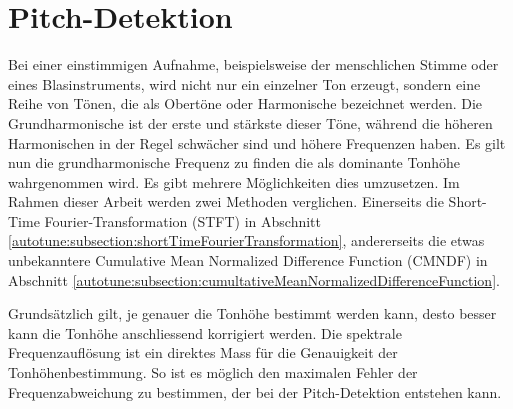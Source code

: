 %
%
%
%
\section{Pitch-Detektion
\label{autotune:section:pitchDetektion}}
Bei einer einstimmigen Aufnahme, beispielsweise der menschlichen Stimme oder eines Blasinstruments,
wird nicht nur ein einzelner Ton erzeugt, sondern eine Reihe von Tönen, die als Obertöne oder Harmonische bezeichnet werden.
Die Grundharmonische ist der erste und stärkste dieser Töne, während die höheren Harmonischen in der Regel schwächer sind und höhere Frequenzen haben.
%
Es gilt nun die grundharmonische Frequenz zu finden die als dominante Tonhöhe wahrgenommen wird.
Es gibt mehrere Möglichkeiten dies umzusetzen.
Im Rahmen dieser Arbeit werden zwei Methoden verglichen.
Einerseits die Short-Time Fourier-Transformation (STFT) in Abschnitt \ref{autotune:subsection:shortTimeFourierTransformation},
%
%
andererseits die etwas unbekanntere Cumulative Mean Normalized Difference Function (CMNDF) in Abschnitt \ref{autotune:subsection:cumultativeMeanNormalizedDifferenceFunction}.
%
%

Grundsätzlich gilt, je genauer die Tonhöhe bestimmt werden kann, desto besser kann die Tonhöhe anschliessend korrigiert werden.
Die spektrale Frequenzauflösung ist ein direktes Mass für die Genauigkeit der Tonhöhenbestimmung.
So ist es möglich den maximalen Fehler der Frequenzabweichung zu bestimmen, der bei der Pitch-Detektion entstehen kann.
%

